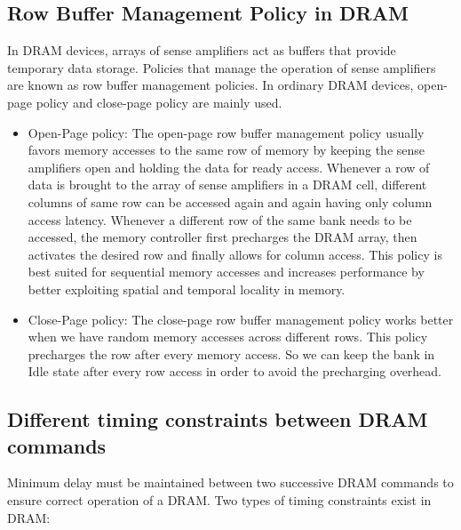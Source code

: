 \subsection{Row Buffer Management Policy in DRAM}\label{b3}
\noindent
In DRAM devices, arrays of sense amplifiers act as buffers that provide temporary data storage. Policies that manage the 
operation of sense amplifiers are known as row buffer management policies. In ordinary DRAM devices, open-page policy and 
close-page policy are mainly used.

\begin{itemize}
\item Open-Page policy: The open-page row buffer management policy usually favors memory accesses to the same row of memory by 
keeping the sense amplifiers open and holding the data for ready access. Whenever a row of data is brought to the array of 
sense amplifiers in a DRAM cell, different columns of same row can be accessed again and again having only column access 
latency. Whenever a different row of the same bank needs to be accessed, the memory controller first precharges the DRAM 
array, then activates the desired row and finally allows for column access. This policy is best suited for sequential memory 
accesses and increases performance by better exploiting spatial and temporal locality in memory.

\item Close-Page policy: The close-page row buffer management policy works better when we have random memory accesses across
different rows. This policy precharges the row after every memory access. So we can keep the bank in Idle state after every 
row access in order to avoid the precharging overhead.  
\end{itemize}

\subsection{Different timing constraints between DRAM commands}\label{b4}
\noindent
Minimum delay must be maintained between two successive DRAM commands to ensure correct operation of a DRAM. Two types of 
timing constraints exist in DRAM: 

